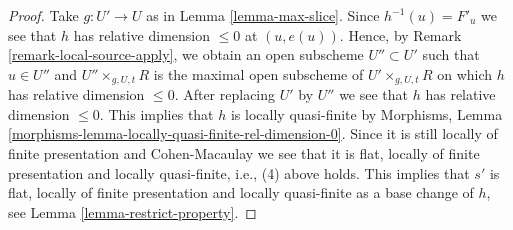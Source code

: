 \documentclass{stacks-project}
\theoremstyle{plain}
\theoremstyle{definition}
\theoremstyle{remark}
\numberwithin{equation}{subsection}
\begin{document}
\begin{proof}
Take $g : U' \to U$ as in
Lemma \ref{lemma-max-slice}.
Since $h^{-1}(u) = F'_u$ we see that $h$ has relative dimension
$\leq 0$ at $(u, e(u))$. Hence, by
Remark \ref{remark-local-source-apply},
we obtain an open subscheme $U'' \subset U'$ such that
$u \in U''$ and $U'' \times_{g, U, t} R$ is the maximal open subscheme
of $U' \times_{g, U, t} R$ on which $h$ has relative dimension $\leq 0$.
After replacing $U'$ by $U''$ we see that $h$ has relative dimension $\leq 0$.
This implies that $h$ is locally quasi-finite by
Morphisms, Lemma \ref{morphisms-lemma-locally-quasi-finite-rel-dimension-0}.
Since it is still locally of finite presentation and Cohen-Macaulay we see
that it is flat, locally of finite presentation and locally quasi-finite,
i.e., (4) above holds. This implies that $s'$ is flat, locally of finite
presentation and locally quasi-finite as a base change of $h$, see
Lemma \ref{lemma-restrict-property}.
\end{proof}
\end{document}
